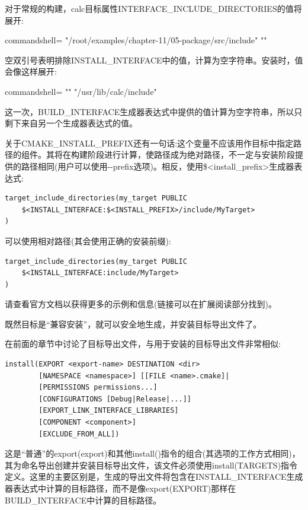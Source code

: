 对于常规的构建，calc目标属性INTERFACE\_INCLUDE\_DIRECTORIES的值将展开:

\begin{tcblisting}{commandshell={}}
"/root/examples/chapter-11/05-package/src/include" ""
\end{tcblisting}

空双引号表明排除INSTALL\_INTERFACE中的值，计算为空字符串。安装时，值会像这样展开:

\begin{tcblisting}{commandshell={}}
"" "/usr/lib/calc/include"
\end{tcblisting}

这一次，BUILD\_INTERFACE生成器表达式中提供的值计算为空字符串，所以只剩下来自另一个生成器表达式的值。

关于CMAKE\_INSTALL\_PREFIX还有一句话:这个变量不应该用作目标中指定路径的组件。其将在构建阶段进行计算，使路径成为绝对路径，不一定与安装阶段提供的路径相同(用户可以使用-{}-prefix选项)。相反，使用\$<install\_prefix>生成器表达式:

\begin{lstlisting}[style=styleCMake]
target_include_directories(my_target PUBLIC
	$<INSTALL_INTERFACE:$<INSTALL_PREFIX>/include/MyTarget>
)
\end{lstlisting}

可以使用相对路径(其会使用正确的安装前缀):

\begin{lstlisting}[style=styleCMake]
target_include_directories(my_target PUBLIC
	$<INSTALL_INTERFACE:include/MyTarget>
)
\end{lstlisting}

请查看官方文档以获得更多的示例和信息(链接可以在扩展阅读部分找到)。

既然目标是“兼容安装”，就可以安全地生成，并安装目标导出文件了。


在前面的章节中讨论了目标导出文件，与用于安装的目标导出文件非常相似:

\begin{lstlisting}[style=styleCMake]
install(EXPORT <export-name> DESTINATION <dir>
		[NAMESPACE <namespace>] [[FILE <name>.cmake]|
		[PERMISSIONS permissions...]
		[CONFIGURATIONS [Debug|Release|...]]
		[EXPORT_LINK_INTERFACE_LIBRARIES]
		[COMPONENT <component>]
		[EXCLUDE_FROM_ALL])
\end{lstlisting}

这是“普通”的export(export)和其他install()指令的组合(其选项的工作方式相同)，其为命名导出创建并安装目标导出文件，该文件必须使用install(TARGETS)指令定义。这里的主要区别是，生成的导出文件将包含在INSTALL\_INTERFACE生成器表达式中计算的目标路径，而不是像export(EXPORT)那样在BUILD\_INTERFACE中计算的目标路径。

